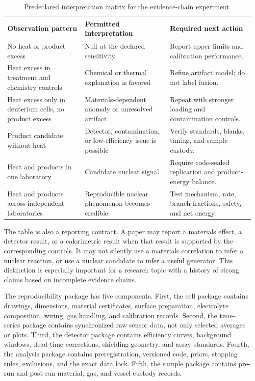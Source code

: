 \documentclass[conference]{IEEEtran}
\begin{document}
\begin{table}[t]
\centering
\caption{Predeclared interpretation matrix for the evidence-chain experiment.}
\label{tab:interpretation}
\setlength{\tabcolsep}{4pt}
\begin{tabular}{>{\raggedright\arraybackslash}p{}>{\raggedright\arraybackslash}p{}>{\raggedright\arraybackslash}p{}}
\toprule
Observation pattern & Permitted interpretation & Required next action \\
\midrule
No heat or product excess & Null at the declared sensitivity & Report upper limits and calibration performance. \\
Heat excess in treatment and chemistry controls & Chemical or thermal explanation is favored & Refine artifact model; do not label fusion. \\
Heat excess only in deuterium cells, no product excess & Materials-dependent anomaly or unresolved artifact & Repeat with stronger loading and contamination controls. \\
Product candidate without heat & Detector, contamination, or low-efficiency issue is possible & Verify standards, blanks, timing, and sample custody. \\
Heat and products in one laboratory & Candidate nuclear signal & Require code-sealed replication and product-energy balance. \\
Heat and products across independent laboratories & Reproducible nuclear phenomenon becomes credible & Test mechanism, rate, branch fractions, safety, and net energy. \\
\bottomrule
\end{tabular}
\end{table}

The table is also a reporting contract. A paper may report a materials effect, a detector result, or a calorimetric result when that result is supported by the corresponding controls. It may not silently use a materials correlation to infer a nuclear reaction, or use a nuclear candidate to infer a useful generator. This distinction is especially important for a research topic with a history of strong claims based on incomplete evidence chains.

The reproducibility package has five components. First, the cell package contains drawings, dimensions, material certificates, surface preparation, electrolyte composition, wiring, gas handling, and calibration records. Second, the time-series package contains synchronized raw sensor data, not only selected averages or plots. Third, the detector package contains efficiency curves, background windows, dead-time corrections, shielding geometry, and assay standards. Fourth, the analysis package contains preregistration, versioned code, priors, stopping rules, exclusions, and the exact data lock. Fifth, the sample package contains pre-run and post-run material, gas, and vessel custody records.
\end{document}
